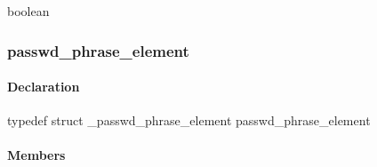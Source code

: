 \documentclass[letterpaper,10pt,english]{sphinxmanual}
\begin{document}
\begin{fulllineitems}
\label{appdev/refs/types/krb5_verify_init_creds_opt:c.krb5_verify_init_creds_opt.flags}
\end{fulllineitems}


\begin{fulllineitems}
\label{appdev/refs/types/krb5_verify_init_creds_opt:c.krb5_verify_init_creds_opt.ap_req_nofail}
boolean

\end{fulllineitems}



\subsubsection{passwd\_phrase\_element}
\label{appdev/refs/types/passwd_phrase_element:passwd-phrase-element-struct}\label{appdev/refs/types/passwd_phrase_element::doc}\label{appdev/refs/types/passwd_phrase_element:passwd-phrase-element}

\begin{fulllineitems}
\label{appdev/refs/types/passwd_phrase_element:c.passwd_phrase_element}
\end{fulllineitems}



\paragraph{Declaration}
\label{appdev/refs/types/passwd_phrase_element:declaration}
typedef struct \_passwd\_phrase\_element  passwd\_phrase\_element


\paragraph{Members}
\label{appdev/refs/types/passwd_phrase_element:members}

\begin{fulllineitems}
\label{appdev/refs/types/passwd_phrase_element:c.passwd_phrase_element.magic}
\end{fulllineitems}
\end{document}
